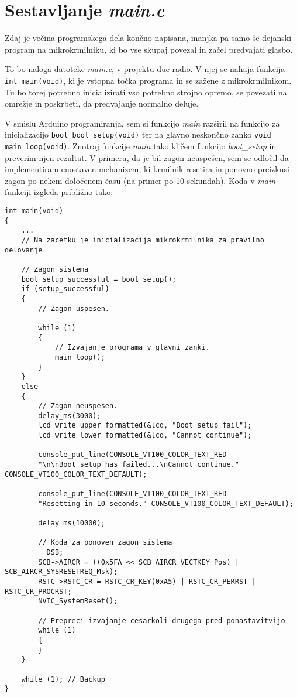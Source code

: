 \documentclass[12pt,a4paper,twoside,openright,slovene]{book}
\begin{document}
\section{Sestavljanje \textit{main.c}}

Zdaj je večina programskega dela končno napisana, manjka pa samo še dejanski program na mikrokrmilniku, ki bo vse skupaj povezal in začel predvajati glasbo. 

To bo naloga datoteke \textit{main.c}, v projektu due-radio. V njej se nahaja funkcija \lstinline{int main(void)}, ki je vstopna točka programa in se zažene z mikrokrmilnikom. Tu bo torej potrebno inicializirati vso potrebno strojno opremo, se povezati na omrežje in poskrbeti, da predvajanje normalno deluje.

V smislu Arduino programiranja, sem si funkcijo \textit{main} razširil na funkcijo za inicializacijo \lstinline{bool boot_setup(void)} ter na glavno neskončno zanko \lstinline{void main_loop(void)}. Znotraj funkcije \textit{main} tako kličem funkcijo \textit{boot\_setup} in preverim njen rezultat. V primeru, da je bil zagon neuspešen, sem se odločil da implementiram enostaven mehanizem, ki krmilnik resetira in ponovno preizkusi zagon po nekem določenem času (na primer po 10 sekundah). Koda v \textit{main} funkciji izgleda približno tako:

\begin{lstlisting}
int main(void)
{
	...
	// Na zacetku je inicializacija mikrokrmilnika za pravilno delovanje
	
	// Zagon sistema
	bool setup_successful = boot_setup();
	if (setup_successful)
	{
		// Zagon uspesen.
		
		while (1)
		{
			// Izvajanje programa v glavni zanki.
			main_loop();
		}
	}
	else
	{
		// Zagon neuspesen.
		delay_ms(3000);
		lcd_write_upper_formatted(&lcd, "Boot setup fail");
		lcd_write_lower_formatted(&lcd, "Cannot continue");
		
		console_put_line(CONSOLE_VT100_COLOR_TEXT_RED
		"\n\nBoot setup has failed...\nCannot continue." CONSOLE_VT100_COLOR_TEXT_DEFAULT);
		
		console_put_line(CONSOLE_VT100_COLOR_TEXT_RED
		"Resetting in 10 seconds." CONSOLE_VT100_COLOR_TEXT_DEFAULT);
		
		delay_ms(10000);
		
		// Koda za ponoven zagon sistema
		__DSB;
		SCB->AIRCR = ((0x5FA << SCB_AIRCR_VECTKEY_Pos) | SCB_AIRCR_SYSRESETREQ_Msk);
		RSTC->RSTC_CR = RSTC_CR_KEY(0xA5) | RSTC_CR_PERRST | RSTC_CR_PROCRST;
		NVIC_SystemReset();
		
		// Prepreci izvajanje cesarkoli drugega pred ponastavitvijo
		while (1)
		{
		}
	}
	
	while (1); // Backup
}
\end{lstlisting}
\end{document}
